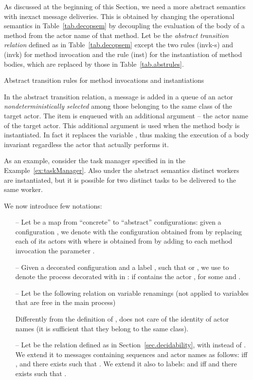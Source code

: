 \documentclass{LMCS}
\theoremstyle{plain}\newtheorem{proposition}[thm]{Proposition}
\theoremstyle{plain}\newtheorem{lemma}[thm]{Lemma}
\theoremstyle{plain}\newtheorem{theorem}[thm]{Theorem}
\theoremstyle{plain}\newtheorem{corollary}[thm]{Corollary}
\newcommand{\rulename}[1]{{\sc(#1)}}
\newcommand{\actsl}{}
\begin{document}
As discussed at the beginning of this Section, 
we need a more abstract semantics with inexact message deliveries.
This is obtained by 
changing the operational semantics in Table~\ref{tab.decopsem} by decoupling
the evaluation of the body of a method from
the actor name of that method.
Let  be the \emph{abstract transition relation}
 defined as
 in Table~\ref{tab.decopsem} except the two
rules \rulename{invk-s} and \rulename{invk} for method invocation and the
rule \rulename{inst} for the instantiation of method bodies, which are replaced by 
those in Table~\ref{tab.abstrules}.
\begin{table}[t]
{\small

}
\caption{\label{tab.abstrules} Abstract transition rules for method invocations and
instantiations}
\end{table}
In the abstract transition relation, a message is added in a queue
of an actor \emph{nondeterministically selected}
among those belonging to the
same class of the target actor. The item  is enqueued 
with an additional argument -- the actor name of the target actor. 
This additional argument is used when the method body is instantiated. In fact
it replaces the variable , thus making the execution
of a body invariant regardless the actor that actually performs it.














As an example, consider the task manager specified
in {\actsl} in the Example~\ref{ex:taskManager}.
Also under the abstract semantics  distinct workers
are instantiated, but it is possible for two distinct
tasks to be delivered to the same worker.

We now introduce few notations:
\vspace{-1mm}
\begin{itemize}
\item[--]
Let  be a map
from ``concrete'' to ``abstract'' configurations:
given a configuration , we denote with
 the configuration
obtained from 
by replacing each of its
actors 
with 
where  is obtained from  by adding 
to each method invocation the parameter .
\item[--] Given a decorated configuration  and a label
, such that  or ,
we use  to denote
the process decorated with  in :
 if  contains the actor
, for some
 and .
\item[--] Let  be the following relation 
on variable renamings (not applied to variables that are free
in the main process) 
\vspace{-3mm}
 
Differently from
the definition of ,  does not care of the 
identity of actor names (it is sufficient that
they belong to the same class). \item[--]
Let  be the relation defined as  in Section~\ref{sec.decidability}, with 
instead of . We extend it
to messages containing sequences and actor names as follows:
 iff ,
 and there exists  such that .
We extend it also to labels: 
and  iff 
and there exists  such that .
\end{itemize}
\end{document}
